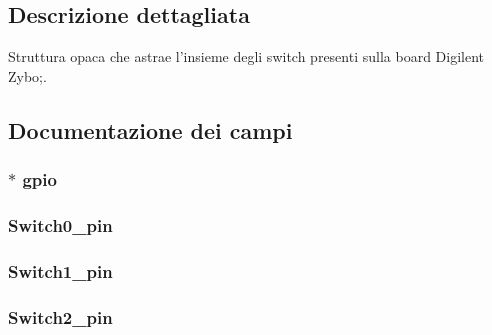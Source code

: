 \subsection{Descrizione dettagliata}
Struttura opaca che astrae l'insieme degli switch presenti sulla board Digilent Zybo;. 

\subsection{Documentazione dei campi}
\hypertarget{struct_zybo_switch__t_acb3116190992a4d8d26545c103304d27}{
\subsubsection[{gpio}]{$\ast$ gpio}}\label{struct_zybo_switch__t_acb3116190992a4d8d26545c103304d27}
\hypertarget{struct_zybo_switch__t_a5b7f83cd96441b7d1692710c6499147c}{
\subsubsection[{Switch0\+\_\+pin}]{ Switch0\+\_\+pin}}\label{struct_zybo_switch__t_a5b7f83cd96441b7d1692710c6499147c}
\hypertarget{struct_zybo_switch__t_a6a3a5739e7e8f138241cafeeb7c1a33f}{
\subsubsection[{Switch1\+\_\+pin}]{ Switch1\+\_\+pin}}\label{struct_zybo_switch__t_a6a3a5739e7e8f138241cafeeb7c1a33f}
\hypertarget{struct_zybo_switch__t_a33eda4a0115ef585edd90078924ca56e}{
\subsubsection[{Switch2\+\_\+pin}]{ Switch2\+\_\+pin}}\label{struct_zybo_switch__t_a33eda4a0115ef585edd90078924ca56e}
